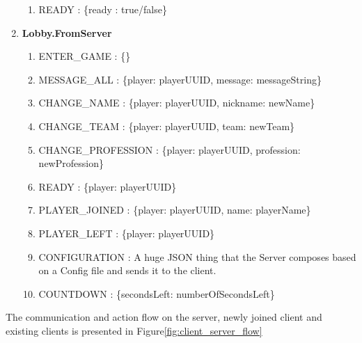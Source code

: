 \begin{enumerate}
\begin{enumerate}
	\item READY :
	\{ready : true/false\}    
     
  \end{enumerate}
  
  
  \item \textbf{Lobby.FromServer}
  
  \begin{enumerate}
    	\item ENTER\_GAME :
    	\{\}
		
		\item MESSAGE\_ALL :
		\{player: playerUUID, message: messageString\}
		
		\item CHANGE\_NAME :
		\{player: playerUUID, nickname: newName\}
		
		\item CHANGE\_TEAM :
		\{player: playerUUID, team: newTeam\}
				
		\item CHANGE\_PROFESSION :
		\{player: playerUUID, profession: newProfession\}
		
		\item READY :
		\{player: playerUUID\}
										
		\item PLAYER\_JOINED :
		\{player: playerUUID, name: playerName\}
		
		\item PLAYER\_LEFT :
		\{player: playerUUID\}
			
		\item CONFIGURATION :
		A huge JSON thing that the Server composes based on a Config file and sends it
		to the client. 
		
		\item COUNTDOWN :
		\{secondsLeft: numberOfSecondsLeft\}
		
  \end{enumerate}  
  
\end{enumerate}

The communication and action flow on the server, newly joined client and
existing clients is presented in Figure\ref{fig:client_server_flow}

